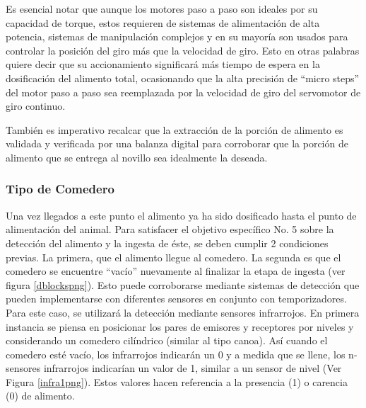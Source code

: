 

Es esencial notar que aunque los motores paso a paso son ideales por su capacidad de torque, estos requieren de sistemas de alimentación de alta potencia, sistemas de manipulación complejos y en su mayoría son usados para controlar la posición del giro más que la velocidad de giro. Esto en otras palabras quiere decir que su accionamiento significará más tiempo de espera en la dosificación del alimento total,  ocasionando que la alta precisión de ``micro steps'' del motor paso a paso sea reemplazada por la velocidad de giro del servomotor de giro continuo.

También es imperativo recalcar que la extracción de la porción de alimento es validada y verificada por una balanza digital para corroborar que la porción de alimento que se entrega al novillo sea idealmente la deseada.

\pagebreak

\subsubsection{Tipo de Comedero}
    
    Una vez llegados a este punto el alimento ya ha sido dosificado hasta el punto de alimentación del animal. Para satisfacer el objetivo específico No. 5 sobre la detección del alimento y la ingesta de éste, se deben cumplir 2 condiciones previas. La primera, que el alimento llegue al comedero. La segunda es que el comedero se encuentre ``vacío'' nuevamente al finalizar la etapa de ingesta (ver figura \ref{dblockspng}). Esto puede corroborarse mediante sistemas de detección que pueden implementarse con diferentes sensores en conjunto con temporizadores. Para este caso, se utilizará la detección mediante sensores infrarrojos. 
    En primera instancia se piensa en posicionar los pares de emisores y receptores por niveles y considerando un comedero cilíndrico (similar al tipo canoa). Así cuando el comedero esté vacío, los infrarrojos indicarán un 0 y a medida que se llene, los n-sensores infrarrojos indicarían un valor de 1, similar a un sensor de nivel (Ver Figura \ref{infra1png}). Estos valores hacen referencia a la presencia (1) o carencia (0) de alimento.
    
